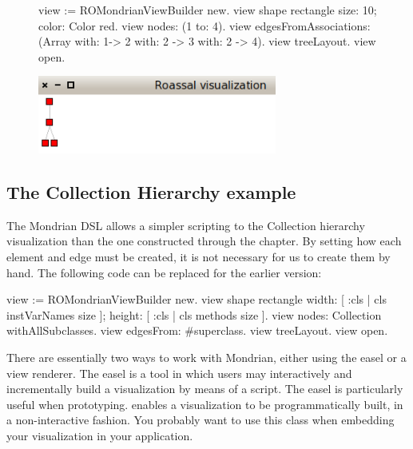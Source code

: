 \documentclass[a4paper,10pt,twoside]{book}
\begin{document}
\begin{figure}[H]
      \begin{minipage}[t]{1\textwidth}
      \vspace{0pt}
\begin{code}{}
view := ROMondrianViewBuilder new.
view shape rectangle 
	size: 10;
	color: Color red.
view nodes: (1 to: 4).
view edgesFromAssociations: (Array with: 1-> 2 with: 2 -> 3 with: 2 -> 4).
view treeLayout.
view open.
\end{code}
   \end{minipage}
   \hfill
   \begin{minipage}[t]{1\textwidth}
	 \vspace{0pt} \raggedright
       \centering
		\includegraphics[width=0.7\textwidth]{mondrian6}
   \end{minipage}
\label{fig:mondrian6}
\end{figure} 




\subsection*{The Collection Hierarchy example}

The Mondrian DSL allows a simpler scripting to the Collection hierarchy visualization than the one constructed through the chapter. By setting how each element and edge must be created, it is not necessary for us to create them by hand.
The following code can be replaced for the earlier version:

\begin{code}{}
view := ROMondrianViewBuilder new.
view shape rectangle
	width: [ :cls | cls instVarNames size ]; 
	height: [ :cls | cls methods size ].
view nodes: Collection withAllSubclasses.
view edgesFrom: #superclass.
view treeLayout.
view open.
\end{code}





There are essentially two ways to work with Mondrian, either using the easel or a view renderer. 
The easel is a tool in which users may interactively and incrementally build a visualization by means of a script.  The easel is particularly useful when prototyping.
 enables a visualization to be programmatically built, in a non-interactive fashion. You probably want to use this class when embedding your visualization in your application.
\end{document}
